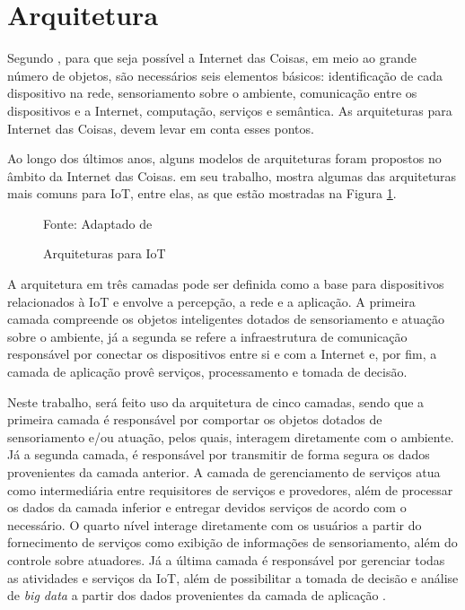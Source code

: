 \section{Arquitetura}

Segundo , para que seja possível a Internet das Coisas, em meio ao grande número de objetos, são necessários seis elementos básicos: identificação de cada dispositivo na rede, sensoriamento sobre o ambiente, comunicação entre os dispositivos e a Internet, computação, serviços e semântica. As arquiteturas para Internet das Coisas, devem levar em conta esses pontos.

Ao longo dos últimos anos, alguns modelos de arquiteturas foram propostos no âmbito da Internet das Coisas.  em seu trabalho, mostra algumas das arquiteturas mais comuns para IoT, entre elas, as que estão mostradas na Figura \ref{fig:cap2_arquiteturas}.
\begin{figure}[htb]
	\caption{Arquiteturas para IoT}
	
	\footnotesize{Fonte: Adaptado de }
	\label{fig:cap2_arquiteturas}
\end{figure}

A arquitetura em três camadas pode ser definida como a base para dispositivos relacionados à IoT e envolve a  percepção, a rede e a aplicação. A primeira camada compreende os objetos inteligentes dotados de sensoriamento e atuação sobre o ambiente, já a segunda se refere a infraestrutura de comunicação responsável por conectar os dispositivos entre si e com a Internet e, por fim, a camada de aplicação provê serviços, processamento e tomada de decisão.  

Neste trabalho, será feito uso da arquitetura de cinco camadas, sendo que a primeira camada é responsável por comportar os objetos dotados de sensoriamento e/ou atuação, pelos quais, interagem diretamente com o ambiente. Já a segunda camada, é responsável por transmitir de forma segura os dados provenientes da camada anterior. A camada de gerenciamento de serviços atua como intermediária entre requisitores de serviços e provedores, além de processar os dados da camada inferior e entregar devidos serviços de acordo com o necessário. O quarto nível interage diretamente com os usuários a partir do fornecimento de serviços como exibição de informações de sensoriamento, além do controle sobre atuadores. Já a última camada é responsável por gerenciar todas as atividades e serviços da IoT, além de possibilitar a tomada de decisão e análise de \textit{big data} a partir dos dados provenientes da camada de aplicação \cite{Al-Fuqaha2015}.

